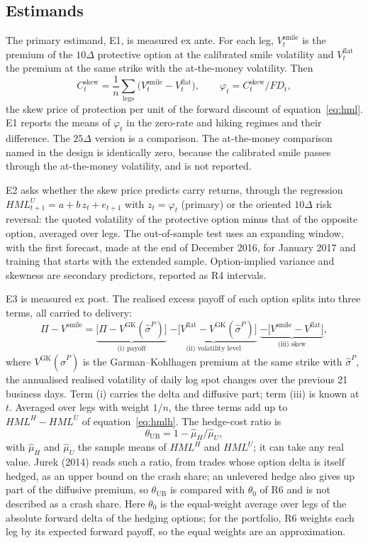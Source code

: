 \documentclass[11pt]{article}
\theoremstyle{result}
\newcommand{\HML}{\mathit{HML}}
\newcommand{\FD}{\mathit{FD}}
\newcommand{\Cskew}{C^{\mathrm{skew}}}
\newcommand{\Vsmile}{V^{\mathrm{smile}}}
\newcommand{\Vflat}{V^{\mathrm{flat}}}
\newcommand{\VGK}{V^{\mathrm{GK}}}
\newcommand{\thUB}{\theta_{\mathrm{UB}}}
\newcommand{\sigP}{\hat\sigma^{P}}
\newcommand{\D}{\Delta}
\begin{document}
\subsection{Estimands}

The primary estimand, E1, is measured ex ante. For each leg, $\Vsmile_t$ is the premium of the $10\D$ protective option at the calibrated smile volatility and $\Vflat_t$ the premium at the same strike with the at-the-money volatility. Then
\begin{equation}\label{eq:phi}
\Cskew_t=\frac1n\sum_{\text{legs}}\bigl(\Vsmile_t-\Vflat_t\bigr),\qquad \varphi_t=\Cskew_t/\FD_t,
\end{equation}
the skew price of protection per unit of the forward discount of equation~\eqref{eq:hml}. E1 reports the means of $\varphi_t$ in the zero-rate and hiking regimes and their difference. The $25\D$ version is a comparison. The at-the-money comparison named in the design is identically zero, because the calibrated smile passes through the at-the-money volatility, and is not reported.

E2 asks whether the skew price predicts carry returns, through the regression $\HML^U_{t+1}=a+b\,z_t+e_{t+1}$ with $z_t=\varphi_t$ (primary) or the oriented $10\D$ risk reversal: the quoted volatility of the protective option minus that of the opposite option, averaged over legs. The out-of-sample test uses an expanding window, with the first forecast, made at the end of December 2016, for January 2017 and training that starts with the extended sample. Option-implied variance and skewness are secondary predictors, reported as R4 intervals.

E3 is measured ex post. The realised excess payoff of each option splits into three terms, all carried to delivery:
\begin{equation}\label{eq:e3}
\Pi-\Vsmile=\underbrace{\bigl[\Pi-\VGK(\sigP)\bigr]}_{\text{(i) payoff}}\;\underbrace{-\bigl[\Vflat-\VGK(\sigP)\bigr]}_{\text{(ii) volatility level}}\;\underbrace{-\bigl[\Vsmile-\Vflat\bigr]}_{\text{(iii) skew}},
\end{equation}
where $\VGK(\sigP)$ is the Garman--Kohlhagen premium at the same strike with $\sigP$, the annualised realised volatility of daily log spot changes over the previous 21 business days. Term (i) carries the delta and diffusive part; term (iii) is known at $t$. Averaged over legs with weight $1/n$, the three terms add up to $\HML^H-\HML^U$ of equation~\eqref{eq:hmlh}. The hedge-cost ratio is
\begin{equation}\label{eq:thub}
\thUB=1-\hat\mu_H/\hat\mu_U,
\end{equation}
with $\hat\mu_H$ and $\hat\mu_U$ the sample means of $\HML^H$ and $\HML^U$; it can take any real value. Jurek (2014) reads such a ratio, from trades whose option delta is itself hedged, as an upper bound on the crash share; an unlevered hedge also gives up part of the diffusive premium, so $\thUB$ is compared with $\theta_0$ of R6 and is not described as a crash share. Here $\theta_0$ is the equal-weight average over legs of the absolute forward delta of the hedging options; for the portfolio, R6 weights each leg by its expected forward payoff, so the equal weights are an approximation.
\end{document}
